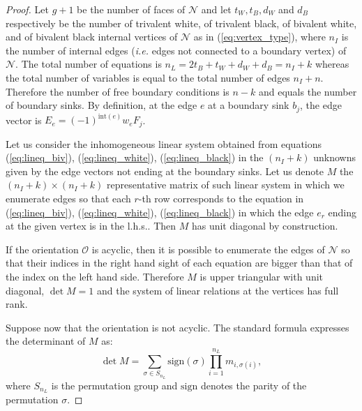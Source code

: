 \documentclass[11pt]{amsart}
\theoremstyle{plain}
\numberwithin{equation}{section}
\begin{document}
\begin{proof} Let $g+1$ be the number of faces of ${\mathcal N}$ and let $t_W, t_B, d_W$ and $d_B$ respectively be the number of trivalent white, of trivalent black, of bivalent white, and of bivalent black internal vertices of ${\mathcal N}$ as in (\ref{eq:vertex_type}), where $n_I$ is the number of internal edges ({\sl i.e.} edges not connected to a boundary vertex) of ${\mathcal N}$. The total number of equations is $n_L=2t_B+ t_W+d_W+d_B =n_I+k$ whereas the total number of variables is equal to the total number of edges $n_I+n$. Therefore the number of free boundary conditions is $n-k$ and equals the number of boundary sinks. By definition, at the edge $e$ at a boundary sink $b_j$, the edge vector is $E_e = (-1)^{\mbox{int}(e)} w_e F_j$. 

Let us consider the inhomogeneous linear system obtained from equations (\ref{eq:lineq_biv}), (\ref{eq:lineq_white}), (\ref{eq:lineq_black}) in the $(n_I+k)$ unknowns given by the edge vectors not ending at the boundary sinks. Let us denote $M$ the $(n_I +k)\times (n_I+k)$ representative matrix of such linear system in which we enumerate edges so that each $r$-th row corresponds to the equation in (\ref{eq:lineq_biv}), (\ref{eq:lineq_white}), (\ref{eq:lineq_black}) in which the edge $e_r$ ending at the given vertex is in the l.h.s.. Then $M$ has unit diagonal by construction. 

If the orientation $\mathcal O$ is acyclic, then it is possible to enumerate the edges of $\mathcal N$ so that their indices in the right hand sight of each equation are bigger than that of the index on the left hand side. Therefore $M$ is upper triangular with unit diagonal, $\det M=1$ and the system of linear relations at the vertices has full rank.

Suppose now that the orientation is not acyclic. The standard formula expresses the determinant of $M$ as:
\begin{equation}
\label{eq:detM}
\det M = \sum\limits_{\sigma\in S_{n_L}} \mbox{sign}(\sigma)\prod\limits_{i=1}^{n_L}m_{i,\sigma(i)},
\end{equation}
where $S_{n_L}$ is the permutation group and $\mbox{sign}$ denotes the parity of the permutation $\sigma$. 


\end{proof}
\end{document}
